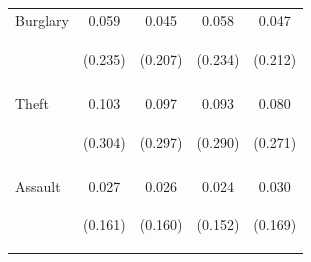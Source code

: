 \begin{center}
\begin{tabular}{lcccc}
\noalign{\smallskip}Burglary & 0.059 & 0.045 & 0.058 & 0.047\\
 & \begin{footnotesize}(0.235)\end{footnotesize} & \begin{footnotesize}(0.207)\end{footnotesize} & \begin{footnotesize}(0.234)\end{footnotesize} & \begin{footnotesize}(0.212)\end{footnotesize}\\
 & \begin{footnotesize}\end{footnotesize} & \begin{footnotesize}\end{footnotesize} & \begin{footnotesize}\end{footnotesize} & \begin{footnotesize}\end{footnotesize}\\
\noalign{\smallskip}Theft & 0.103 & 0.097 & 0.093 & 0.080\\
 & \begin{footnotesize}(0.304)\end{footnotesize} & \begin{footnotesize}(0.297)\end{footnotesize} & \begin{footnotesize}(0.290)\end{footnotesize} & \begin{footnotesize}(0.271)\end{footnotesize}\\
 & \begin{footnotesize}\end{footnotesize} & \begin{footnotesize}\end{footnotesize} & \begin{footnotesize}\end{footnotesize} & \begin{footnotesize}\end{footnotesize}\\
\noalign{\smallskip}Assault & 0.027 & 0.026 & 0.024 & 0.030\\
 & \begin{footnotesize}(0.161)\end{footnotesize} & \begin{footnotesize}(0.160)\end{footnotesize} & \begin{footnotesize}(0.152)\end{footnotesize} & \begin{footnotesize}(0.169)\end{footnotesize}\\

\end{tabular}
\end{center}
